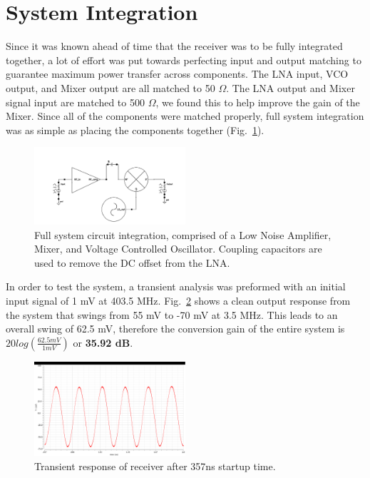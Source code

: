 \section{System Integration}
Since it was known ahead of time that the receiver was to be fully integrated together, a lot of effort was put towards perfecting input and output matching to guarantee maximum power transfer across components. The LNA input, VCO output, and Mixer output are all matched to 50 $\Omega$. The LNA output and Mixer signal input are matched to 500 $\Omega$, we found this to help improve the gain of the Mixer. Since all of the components were matched properly, full system integration was as simple as placing the components together (Fig.~\ref{fig:fullsystem}). 

\begin{figure}[h]
   \centering
    \includegraphics[width=0.5\textwidth]{figures/FullSystem.png}
    \caption{Full system circuit integration, comprised of a Low Noise Amplifier, Mixer, and Voltage Controlled Oscillator. Coupling capacitors are used to remove the DC offset from the LNA. }
    \label{fig:fullsystem}
\end{figure}

In order to test the system, a transient analysis was preformed with an initial input signal of 1 mV at 403.5 MHz. Fig.~\ref{fig:fullsystemtrans} shows a clean output response from the system that swings from 55 mV to -70 mV at 3.5 MHz. This leads to an overall swing of 62.5 mV, therefore the conversion gain of the entire system is $20log(\frac{62.5 mV}{1 mV})$ or {\bf 35.92 dB}.

\begin{figure}[H]
   \centering
    \includegraphics[width=0.5\textwidth]{figures/FullSystemTrans}
    \caption{Transient response of receiver after 357ns startup time.}
    \label{fig:fullsystemtrans}
\end{figure}


